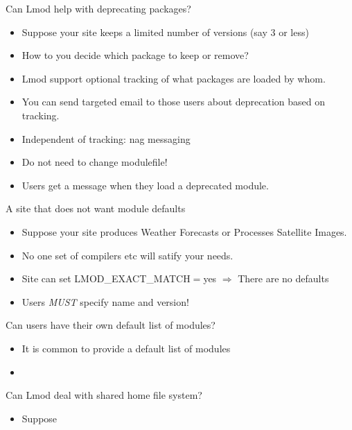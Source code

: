 \documentclass{beamer}
\begin{document}
\begin{frame}{Can Lmod help with deprecating packages?}
  \begin{itemize}
    \item Suppose your site keeps a limited number of versions (say 3
      or less)
    \item How to you decide which package to keep or remove?
    \item Lmod support optional tracking of what packages are loaded
      by whom.
    \item You can send targeted email to those users about
      deprecation based on tracking.
    \item Independent of tracking: nag messaging
    \item Do not need to change modulefile!
    \item Users get a message when they load a deprecated module. 
  \end{itemize}
\end{frame}

\begin{frame}{A site that does not want module defaults}
  \begin{itemize}
    \item Suppose your site produces Weather Forecasts or Processes
      Satellite Images.
    \item No one set of compilers etc will satify your needs.
    \item Site can set LMOD\_EXACT\_MATCH$=$yes $\Rightarrow$ There are no defaults
    \item Users \emph{MUST} specify name and version!
  \end{itemize}
\end{frame}

\begin{frame}{Can users have their own default list of modules?}
  \begin{itemize}
    \item It is common to provide a default list of modules
    \item 
  \end{itemize}
\end{frame}





\begin{frame}{Can Lmod deal with shared home file system?}
  \begin{itemize}
    \item Suppose 
  \end{itemize}
\end{frame}
\end{document}
